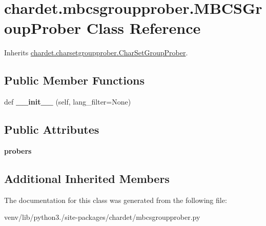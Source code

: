 \hypertarget{classchardet_1_1mbcsgroupprober_1_1_m_b_c_s_group_prober}{}\section{chardet.\+mbcsgroupprober.\+M\+B\+C\+S\+Group\+Prober Class Reference}
\label{classchardet_1_1mbcsgroupprober_1_1_m_b_c_s_group_prober}


Inherits \hyperlink{classchardet_1_1charsetgroupprober_1_1_char_set_group_prober}{chardet.\+charsetgroupprober.\+Char\+Set\+Group\+Prober}.

\subsection*{Public Member Functions}
\begin{DoxyCompactItemize}
\item 
\mbox{\label{classchardet_1_1mbcsgroupprober_1_1_m_b_c_s_group_prober_a202e78365a031902d56863eef5952b77}} 
def {\bfseries \+\_\+\+\_\+init\+\_\+\+\_\+} (self, lang\+\_\+filter=None)
\end{DoxyCompactItemize}
\subsection*{Public Attributes}
\begin{DoxyCompactItemize}
\item 
\mbox{\label{classchardet_1_1mbcsgroupprober_1_1_m_b_c_s_group_prober_a93d6a7d7b4d8ffce81735c8095d5aea8}} 
{\bfseries probers}
\end{DoxyCompactItemize}
\subsection*{Additional Inherited Members}


The documentation for this class was generated from the following file\+:\begin{DoxyCompactItemize}
\item 
venv/lib/python3./site-\/packages/chardet/mbcsgroupprober.\+py\end{DoxyCompactItemize}
